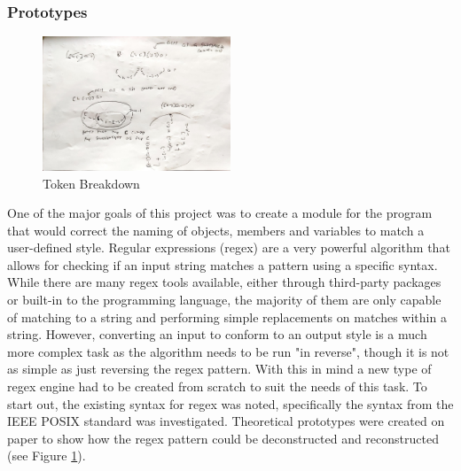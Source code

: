 \subsubsection{Prototypes}

\begin{figure}
    \centering
    \caption{Token Breakdown}
    \label{fig:TokenBreakdown}
    \includegraphics[angle=90,width=0.5\textwidth]{Figures/TokenBreakdown.jpg}
\end{figure}
One of the major goals of this project was to create a module for the program that would correct the naming of objects, members and variables to match a user-defined style. Regular expressions (regex) are a very powerful algorithm that allows for checking if an input string matches a pattern using a specific syntax. While there are many regex tools available, either through third-party packages or built-in to the programming language, the majority of them are only capable of matching to a string and performing simple replacements on matches within a string. However, converting an input to conform to an output style is a much more complex task as the algorithm needs to be run "in reverse", though it is not as simple as just reversing the regex pattern. With this in mind a new type of regex engine had to be created from scratch to suit the needs of this task.
To start out, the existing syntax for regex was noted, specifically the syntax from the IEEE POSIX standard \citep*{enwiki:1218131380} was investigated.
Theoretical prototypes were created on paper to show how the regex pattern could be deconstructed and reconstructed (see Figure \ref{fig:TokenBreakdown}).

